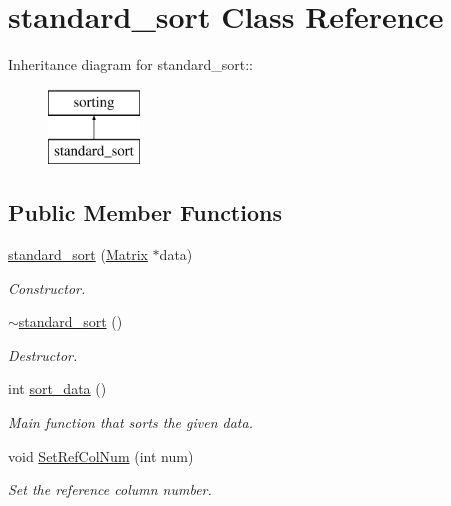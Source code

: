 \hypertarget{classstandard__sort}{
\section{standard\_\-sort Class Reference}
\label{d4/dec/classstandard__sort}
}
Inheritance diagram for standard\_\-sort::\begin{figure}[H]
\begin{center}
\leavevmode
\includegraphics[height=2cm]{d4/dec/classstandard__sort}
\end{center}
\end{figure}
\subsection*{Public Member Functions}
\begin{DoxyCompactItemize}
\item 
\hypertarget{classstandard__sort_a70a7e1ba1cae2d294b252f6182f81436}{
\hyperlink{classstandard__sort_a70a7e1ba1cae2d294b252f6182f81436}{standard\_\-sort} (\hyperlink{classMatrix}{Matrix} $\ast$data)}
\label{d4/dec/classstandard__sort_a70a7e1ba1cae2d294b252f6182f81436}

\begin{DoxyCompactList}\small\item\em Constructor. \item\end{DoxyCompactList}\item 
\hypertarget{classstandard__sort_af40099379c12e092519a20afbad5c6b9}{
\hyperlink{classstandard__sort_af40099379c12e092519a20afbad5c6b9}{$\sim$standard\_\-sort} ()}
\label{d4/dec/classstandard__sort_af40099379c12e092519a20afbad5c6b9}

\begin{DoxyCompactList}\small\item\em Destructor. \item\end{DoxyCompactList}\item 
int \hyperlink{classstandard__sort_a34a0d914ebac6e328dfe371a1e1a8afb}{sort\_\-data} ()
\begin{DoxyCompactList}\small\item\em Main function that sorts the given data. \item\end{DoxyCompactList}\item 
\hypertarget{classstandard__sort_a5bf11721c6c6147440c68409b830a31a}{
void \hyperlink{classstandard__sort_a5bf11721c6c6147440c68409b830a31a}{SetRefColNum} (int num)}
\label{d4/dec/classstandard__sort_a5bf11721c6c6147440c68409b830a31a}

\begin{DoxyCompactList}\small\item\em Set the reference column number. \item\end{DoxyCompactList}\end{DoxyCompactItemize}


